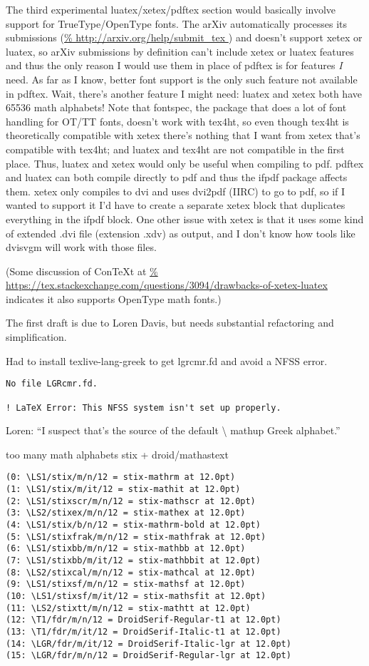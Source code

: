 \documentclass[12pt]{article}
\begin{document}
The third experimental luatex/xetex/pdftex section would basically
involve support for TrueType/OpenType fonts.  The arXiv automatically
processes its submissions (\url{%
  http://arxiv.org/help/submit_tex }) and doesn't support xetex or
luatex, so arXiv submissions by definition can't include xetex or
luatex features and thus the only reason I would use them in place of
pdftex is for features \emph{I} need.  As far as I know, better font
support is the only such feature not available in pdftex.  Wait,
there's another feature I might need: luatex and xetex both have 65536
math alphabets!  Note that fontspec, the package that does a lot of
font handling for OT/TT fonts, doesn't work with tex4ht, so even
though tex4ht is theoretically compatible with xetex there's nothing
that I want from xetex that's compatible with tex4ht; and luatex and
tex4ht are not compatible in the first place.  Thus, luatex and xetex
would only be useful when compiling to pdf.  pdftex and luatex can
both compile directly to pdf and thus the ifpdf package affects them.
xetex only compiles to dvi and uses dvi2pdf (IIRC) to go to pdf, so if
I wanted to support it I'd have to create a separate xetex block that
duplicates everything in the ifpdf block.  One other issue with xetex
is that it uses some kind of extended .dvi file (extension .xdv) as
output, and I don't know how tools like dvisvgm will work with those
files.

(Some discussion of ConTeXt at \url{%
https://tex.stackexchange.com/questions/3094/drawbacks-of-xetex-luatex
} indicates it also supports OpenType math fonts.)

The first draft is due to Loren Davis, but needs substantial
refactoring and simplification.

Had to install texlive-lang-greek to get lgrcmr.fd and avoid a NFSS error.

\begin{lstlisting}
No file LGRcmr.fd.

! LaTeX Error: This NFSS system isn't set up properly.
\end{lstlisting}

Loren: ``I suspect that's the source of the default \textbackslash
mathup Greek alphabet.''

too many math alphabets
stix + droid/mathastext
\begin{lstlisting}
(0: \LS1/stix/m/n/12 = stix-mathrm at 12.0pt)
(1: \LS1/stix/m/it/12 = stix-mathit at 12.0pt)
(2: \LS1/stixscr/m/n/12 = stix-mathscr at 12.0pt)
(3: \LS2/stixex/m/n/12 = stix-mathex at 12.0pt)
(4: \LS1/stix/b/n/12 = stix-mathrm-bold at 12.0pt)
(5: \LS1/stixfrak/m/n/12 = stix-mathfrak at 12.0pt)
(6: \LS1/stixbb/m/n/12 = stix-mathbb at 12.0pt)
(7: \LS1/stixbb/m/it/12 = stix-mathbbit at 12.0pt)
(8: \LS2/stixcal/m/n/12 = stix-mathcal at 12.0pt)
(9: \LS1/stixsf/m/n/12 = stix-mathsf at 12.0pt)
(10: \LS1/stixsf/m/it/12 = stix-mathsfit at 12.0pt)
(11: \LS2/stixtt/m/n/12 = stix-mathtt at 12.0pt)
(12: \T1/fdr/m/n/12 = DroidSerif-Regular-t1 at 12.0pt)
(13: \T1/fdr/m/it/12 = DroidSerif-Italic-t1 at 12.0pt)
(14: \LGR/fdr/m/it/12 = DroidSerif-Italic-lgr at 12.0pt)
(15: \LGR/fdr/m/n/12 = DroidSerif-Regular-lgr at 12.0pt)  
\end{lstlisting}
\end{document}
